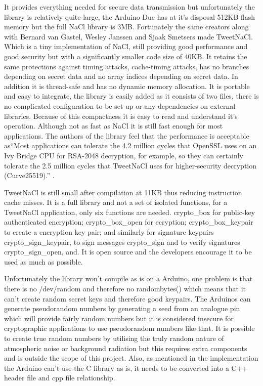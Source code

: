 It provides everything needed for secure data transmission but unfortunately the library is relatively quite large, the Arduino Due has at it's disposal 512KB flash memory but the full NaCl library is 3MB. Fortunately the same creators along with Bernard van Gastel, Wesley Janssen and Sjaak Smetsers made TweetNaCl. Which is a tiny implementation of NaCl, still providing good performance and good security but with a significantly smaller code size of 40KB. It retains the same protections against timing attacks, cache-timing attacks, has no branches depending on secret data and no array indices depending on secret data. In addition it is thread-safe and has no dynamic memory allocation\cite{tweetnacl}. It is portable and easy to integrate, the library is easily added as it consists of two files, there is no complicated configuration to be set up or any dependencies on external libraries. Because of this compactness it is easy to read and understand it's operation. Although not as fast as NaCl it is still fast enough for most applications. The authors of the library feel that the performance is acceptable as``Most applications can tolerate the 4.2 million cycles that OpenSSL uses on an Ivy Bridge CPU for RSA-2048 decryption, for example, so they can certainly tolerate the 2.5 million cycles that TweetNaCl uses for higher-security decryption (Curve25519).'' \cite{tweetnacl3}.

TweetNaCl is still small after compilation at 11KB thus reducing instruction cache misses. It is a full library and not a set of isolated functions, for a TweetNaCl application, only six functions are needed. crypto\_box for public-key authenticated encryption; crypto\_box\_open for ecryption; crypto\_box\_keypair to create a encryption key pair; and similarly for signature keypairs crypto\_sign\_keypair, to sign messages crypto\_sign and to verify signatures crypto\_sign\_open, and. It is open source and the developers encourage it to be used as much as possible. 

Unfortunately the library won't compile as is on a Arduino, one problem is that there is no /dev/random and therefore no randombytes() which means that it can't create random secret keys and therefore good keypairs. The Arduinos can generate pseudorandom numbers by generating a seed from an analogue pin which will provide fairly random numbers but it is considered insecure for cryptographic applications to use pseudorandom numbers like that\cite{arduinopseudo}. It is possible to create true random numbers by utilising the truly random nature of atmospheric noise or background radiation but this requires extra components and is outside the scope of this project. Also, as mentioned in the implementation the Arduino can't use the C library as is, it needs to be converted into a C++ header file and cpp file relationship.


